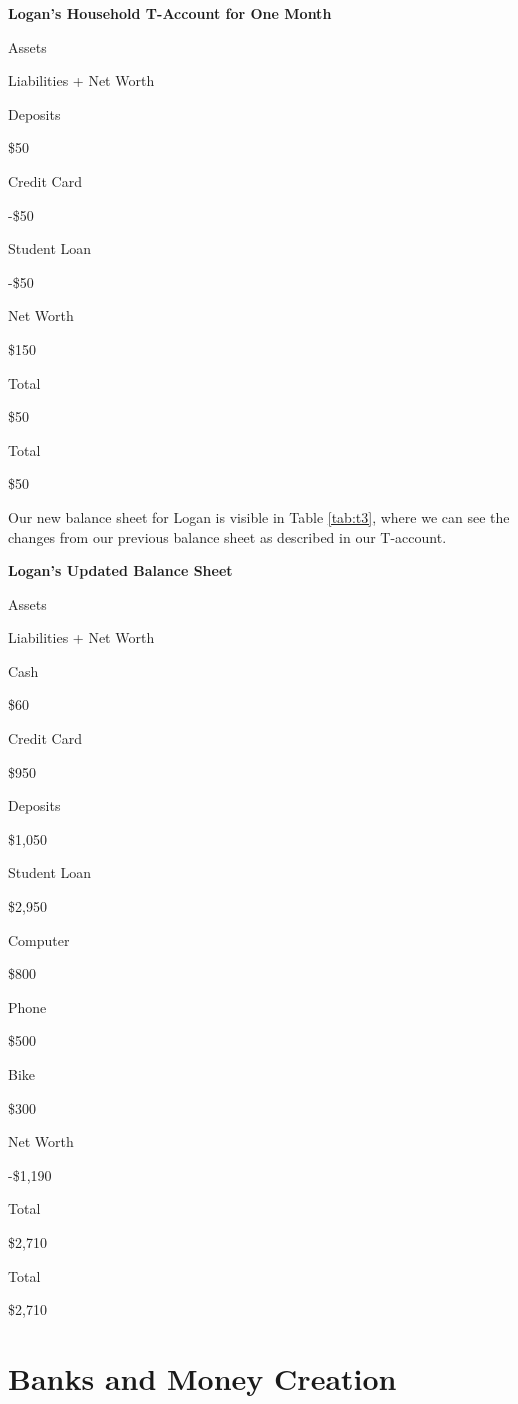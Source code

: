 \documentclass[
]{book}
\begin{document}
\label{tab:t2}\textbf{Logan's Household T-Account for One Month}

Assets

Liabilities + Net Worth

Deposits

\$50

Credit Card

-\$50

Student Loan

-\$50

Net Worth

\$150

Total

\$50

Total

\$50

Our new balance sheet for Logan is visible in Table \ref{tab:t3}, where we can see the changes from our previous balance sheet as described in our T-account.

\label{tab:t3}\textbf{Logan's Updated Balance Sheet}

Assets

Liabilities + Net Worth

Cash

\$60

Credit Card

\$950

Deposits

\$1,050

Student Loan

\$2,950

Computer

\$800

Phone

\$500

Bike

\$300

Net Worth

-\$1,190

Total

\$2,710

Total

\$2,710

\hypertarget{banks-and-money-creation}{%
\section{Banks and Money Creation}\label{banks-and-money-creation}}
\end{document}
